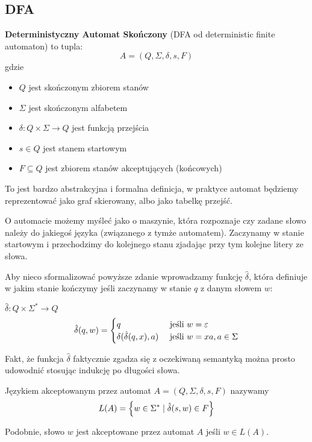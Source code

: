 \subsection{DFA}

\begin{definition}
	\textbf{Deterministyczny Automat Skończony} (DFA od deterministic finite automaton) to tupla:
	\[
		A = (Q, \Sigma, \delta, s, F)
	\]
	gdzie
	\begin{itemize}
		\item \( Q \) jest skończonym zbiorem stanów
		\item \( \Sigma \) jest skończonym alfabetem
		\item \( \delta: Q \times \Sigma \rightarrow Q \) jest funkcją przejścia
		\item \( s \in Q \) jest stanem startowym
		\item \( F \subseteq Q \) jest zbiorem stanów akceptujących (końcowych)
	\end{itemize}
\end{definition}

To jest bardzo abstrakcyjna i formalna definicja, w praktyce automat będziemy reprezentować jako graf skierowany, albo jako tabelkę przejść.

O automacie możemy myśleć jako o maszynie, która rozpoznaje czy zadane słowo należy do jakiegoś języka (związanego z tymże automatem). Zaczynamy w stanie startowym i przechodzimy do kolejnego stanu zjadając przy tym kolejne litery ze słowa.

Aby nieco sformalizować powyższe zdanie wprowadzamy funkcję \( \hat \delta \), która definiuje w jakim stanie kończymy jeśli zaczynamy w stanie \( q \) z danym słowem \( w \):
\begin{definition}
	\( \hat \delta : Q \times \Sigma^* \rightarrow Q \)
	\[
		\hat \delta(q, w) = \begin{cases}
			q                            & \text{ jeśli } w = \varepsilon             \\
			\delta(\hat \delta(q, x), a) & \text{ jeśli } w = xa, a \in \Sigma \\
		\end{cases}
	\]
\end{definition}

Fakt, że funkcja \( \hat \delta \) faktycznie zgadza się z oczekiwaną semantyką można prosto udowodnić stosując indukcję po długości słowa.

\begin{definition}
	Językiem akceptowanym przez automat \( A = (Q, \Sigma, \delta, s, F) \) nazywamy
	\[
		L(A) = \set{w \in \Sigma^* \mid \hat \delta(s, w) \in F}
	\]

	Podobnie, słowo \( w \) jest akceptowane przez automat \( A \) jeśli \( w \in L(A) \).
\end{definition}

